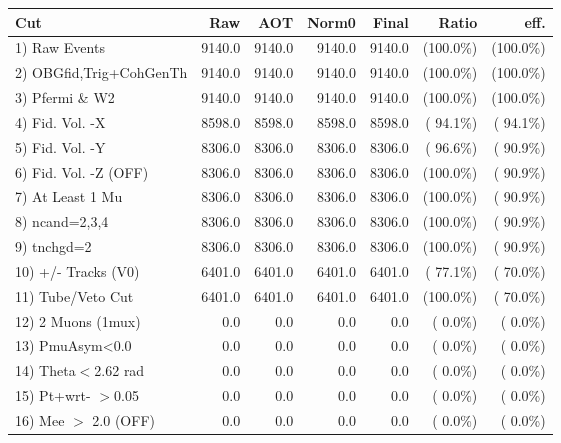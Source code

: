  \begin{table}[h!]\centering
 \begin{tabular}{||l||r|r|r|r|r|r||}
 \hline
 \hline
 Cut & Raw & AOT & Norm0 & Final & Ratio & eff.       \\
 \hline
  1) Raw Events           &       9140.0 &       9140.0 &       9140.0 &       9140.0 & (100.0\%) & (100.0\%) \\
  2) OBGfid,Trig+CohGenTh &       9140.0 &       9140.0 &       9140.0 &       9140.0 & (100.0\%) & (100.0\%) \\
  3) Pfermi \& W2         &       9140.0 &       9140.0 &       9140.0 &       9140.0 & (100.0\%) & (100.0\%) \\
  4) Fid. Vol. -X         &       8598.0 &       8598.0 &       8598.0 &       8598.0 & ( 94.1\%) & ( 94.1\%) \\
  5) Fid. Vol. -Y         &       8306.0 &       8306.0 &       8306.0 &       8306.0 & ( 96.6\%) & ( 90.9\%) \\
  6) Fid. Vol. -Z (OFF)   &       8306.0 &       8306.0 &       8306.0 &       8306.0 & (100.0\%) & ( 90.9\%) \\
  7) At Least 1 Mu        &       8306.0 &       8306.0 &       8306.0 &       8306.0 & (100.0\%) & ( 90.9\%) \\
  8) ncand=2,3,4          &       8306.0 &       8306.0 &       8306.0 &       8306.0 & (100.0\%) & ( 90.9\%) \\
  9) tnchgd=2             &       8306.0 &       8306.0 &       8306.0 &       8306.0 & (100.0\%) & ( 90.9\%) \\
 10) +/- Tracks (V0)      &       6401.0 &       6401.0 &       6401.0 &       6401.0 & ( 77.1\%) & ( 70.0\%) \\
 11) Tube/Veto Cut        &       6401.0 &       6401.0 &       6401.0 &       6401.0 & (100.0\%) & ( 70.0\%) \\
 12) 2 Muons (1mux)       &          0.0 &          0.0 &          0.0 &          0.0 & (  0.0\%) & (  0.0\%) \\
 13) PmuAsym<0.0          &          0.0 &          0.0 &          0.0 &          0.0 & (  0.0\%) & (  0.0\%) \\
 14) Theta$<$2.62 rad     &          0.0 &          0.0 &          0.0 &          0.0 & (  0.0\%) & (  0.0\%) \\
 15) Pt+wrt- $>$0.05      &          0.0 &          0.0 &          0.0 &          0.0 & (  0.0\%) & (  0.0\%) \\
 16) Mee $>$ 2.0  (OFF)   &          0.0 &          0.0 &          0.0 &          0.0 & (  0.0\%) & (  0.0\%) \\

\end{tabular}
\end{table}
